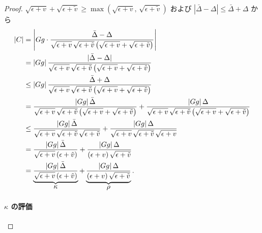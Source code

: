 \documentclass[dvipdfmx,a4paper,11pt]{jsarticle}
\begin{document}
\begin{proof}
$\sqrt{\epsilon+v} + \sqrt{\epsilon+\tilde{v}} \geq 
 \max(\sqrt{\epsilon+v},\,\sqrt{\epsilon+\tilde{v}})$
および $|\bar{\Delta} - \Delta| \leq \bar{\Delta} + \Delta$ から
\begin{align}
    |C|
    &= \left|
        Gg \cdot
        \frac{\bar{\Delta}-\Delta}{
          \sqrt{\epsilon+v}\,\sqrt{\epsilon+\tilde{v}}\,
          \bigl(\sqrt{\epsilon+v}+\sqrt{\epsilon+\tilde{v}}\bigr)
        }
      \right| \notag\\
    &= |Gg|\,
      \frac{|\bar{\Delta}-\Delta|}{
        \sqrt{\epsilon+v}\,\sqrt{\epsilon+\tilde{v}}\,
        \bigl(\sqrt{\epsilon+v}+\sqrt{\epsilon+\tilde{v}}\bigr)
      } \notag\\
    &\le
      |Gg|\,
      \frac{\bar{\Delta}+\Delta}{
        \sqrt{\epsilon+v}\,\sqrt{\epsilon+\tilde{v}}\,
        \bigl(\sqrt{\epsilon+v}+\sqrt{\epsilon+\tilde{v}}\bigr)
      }
      \label{eq:C_split_step1}\\
    &= \frac{|Gg|\,\bar{\Delta}}{
        \sqrt{\epsilon+v}\,\sqrt{\epsilon+\tilde{v}}\,
        \bigl(\sqrt{\epsilon+v}+\sqrt{\epsilon+\tilde{v}}\bigr)}
     + \frac{|Gg|\,\Delta}{
        \sqrt{\epsilon+v}\,\sqrt{\epsilon+\tilde{v}}\,
        \bigl(\sqrt{\epsilon+v}+\sqrt{\epsilon+\tilde{v}}\bigr)}
      \notag\\
    &\le
      \frac{|Gg|\,\bar{\Delta}}{
        \sqrt{\epsilon+v}\,\sqrt{\epsilon+\tilde{v}}\,
        \sqrt{\epsilon+\tilde{v}}}
     + \frac{|Gg|\,\Delta}{
        \sqrt{\epsilon+v}\,\sqrt{\epsilon+\tilde{v}}\,
        \sqrt{\epsilon+v}}
      \label{eq:C_split_step2}\\
    &= \frac{|Gg|\,\bar{\Delta}}{\sqrt{\epsilon+v}\,(\epsilon+\tilde{v})}
     + \frac{|Gg|\,\Delta}{(\epsilon+v)\,\sqrt{\epsilon+\tilde{v}}} \notag\\
    &= \underbrace{\frac{|Gg|\,\bar{\Delta}}{\sqrt{\epsilon+v}\,(\epsilon+\tilde{v})}}_{\displaystyle \kappa}
     + \underbrace{\frac{|Gg|\,\Delta}{(\epsilon+v)\,\sqrt{\epsilon+\tilde{v}}}}_{\displaystyle \rho}.
    \label{eq:kappa_rho_Delta}
\end{align}


\paragraph{$\kappa$ の評価}


\end{proof}
\end{document}
